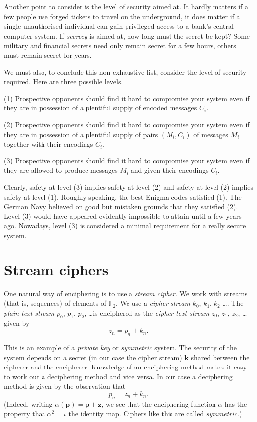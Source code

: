\documentclass[12pt,a4paper]{article}
\theoremstyle{plain}
\theoremstyle{definition}
\begin{document}
Another point to consider is the level of
security aimed at. It hardly matters if
a few people use forged tickets to travel
on the underground, it does matter
if a single unauthorised individual can gain
privileged access to a bank's central computer
system. If \emph{secrecy} is aimed at, how long
must the secret be kept? Some military
and financial secrets need only remain secret
for a few hours, others must remain secret
for years.

We must also, to conclude this non-exhaustive
list, consider the level of security required.
Here are three possible levels.

(1) Prospective opponents should find
it hard to compromise your system even
if they are in possession of
a plentiful supply of encoded messages $C_{i}$.

(2) Prospective opponents should find
it hard to compromise your system even
if they are in possession of
a plentiful supply of pairs $(M_{i},C_{i})$
of messages $M_{i}$ together with their encodings $C_{i}$.

(3) Prospective opponents should find
it hard to compromise your system even
if they are allowed to produce messages $M_{i}$
and given their encodings $C_{i}$.

\noindent Clearly, safety
at level (3) implies safety at level (2)
and safety at level (2) implies safety
at level (1). Roughly speaking, the best Enigma codes
satisfied (1). The German Navy believed on good
but mistaken grounds that they satisfied (2).
Level (3) would have appeared evidently impossible
to attain until a few years ago.
Nowadays, level (3) is considered
a minimal requirement for a really secure system.

\section{Stream ciphers} One natural way of
enciphering is to use a \emph{stream cipher}.
We work with streams (that is, sequences) of
elements of ${\mathbb F}_{2}$.
We use a \emph{cipher stream} $k_{0}$, $k_{1}$,
$k_{2}$ \dots. The \emph{plain text stream}
$p_{0}$, $p_{1}$, $p_{2}$, \dots is enciphered
as the \emph{cipher text stream}
$z_{0}$, $z_{1}$, $z_{2}$, \dots  given by
\[z_{n}=p_{n}+k_{n}.\]

This is an example of a \emph{private key} or
\emph{symmetric} system. The security of
the system depends on a secret (in our
case the cipher stream) ${\mathbf k}$
shared between the cipherer and the encipherer.
Knowledge of an enciphering method makes it
easy to work out a deciphering method
and vice versa. In our case a deciphering method
is given by the observation that
\[p_{n}=z_{n}+k_{n}.\]
(Indeed, writing $\alpha(\mathbf{p})=\mathbf{p}+\mathbf{z}$,
we see that the enciphering function $\alpha$ has
the property that $\alpha^{2}=\iota$ the identity map.
Ciphers like this are called \emph{symmetric}.)
\end{document}
